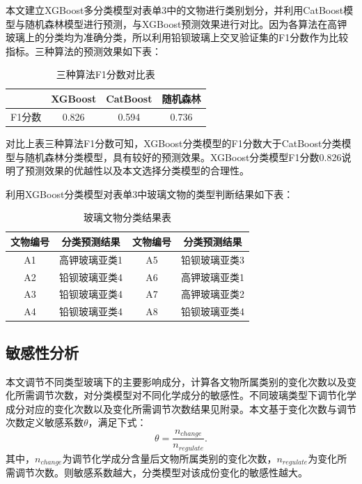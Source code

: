 \documentclass[withoutpreface,bwprint]{cumcmthesis} %
\begin{document}
本文建立XGBoost多分类模型对表单3中的文物进行类别划分，并利用CatBoost模型与随机森林模型进行预测，与XGBoost预测效果进行对比。因为各算法在高钾玻璃上的分类均为准确分类，所以利用铅钡玻璃上交叉验证集的F1分数作为比较指标。三种算法的预测效果如下表：

\begin{table}[H]
  \centering
  \caption{三种算法F1分数对比表}
  \begin{tabular}{cccc}
    \toprule[1.5pt]
    & XGBoost & CatBoost & 随机森林  \\ \hline
    F1分数 & 0.826   & 0.594    & 0.736 \\ \bottomrule[1.5pt]
  \end{tabular}
\end{table}

对比上表三种算法F1分数可知，XGBoost分类模型的F1分数大于CatBoost分类模型与随机森林分类模型，具有较好的预测效果。XGBoost分类模型F1分数0.826说明了预测效果的优越性以及本文选择分类模型的合理性。

利用XGBoost分类模型对表单3中玻璃文物的类型判断结果如下表：

\begin{table}[H]
  \centering
  \caption{玻璃文物分类结果表}
  \begin{tabular}{cccc}
    \toprule[1.5pt]
    文物编号 & 分类预测结果  & 文物编号 & 分类预测结果  \\ \hline
    A1   & 高钾玻璃亚类1 & A5   & 铅钡玻璃亚类3 \\
    A2   & 铅钡玻璃亚类4 & A6   & 高钾玻璃亚类1 \\
    A3   & 铅钡玻璃亚类4 & A7   & 高钾玻璃亚类2 \\
    A4   & 铅钡玻璃亚类4 & A8   & 铅钡玻璃亚类4 \\ \bottomrule[1.5pt]
  \end{tabular}
\end{table}

\subsection{敏感性分析}

本文调节不同类型玻璃下的主要影响成分，计算各文物所属类别的变化次数以及变化所需调节次数，对分类模型对不同化学成分的敏感性。不同玻璃类型下调节化学成分对应的变化次数以及变化所需调节次数结果见附录。本文基于变化次数与调节次数定义敏感系数$\theta$，满足下式：
\begin{equation}
 \theta = \frac{n_{change}}{n_{regulate}}.
\end{equation}
其中，$n_{change}$为调节化学成分含量后文物所属类别的变化次数，$n_{regulate}$为变化所需调节次数。则敏感系数越大，分类模型对该成份变化的敏感性越大。
\end{document}
